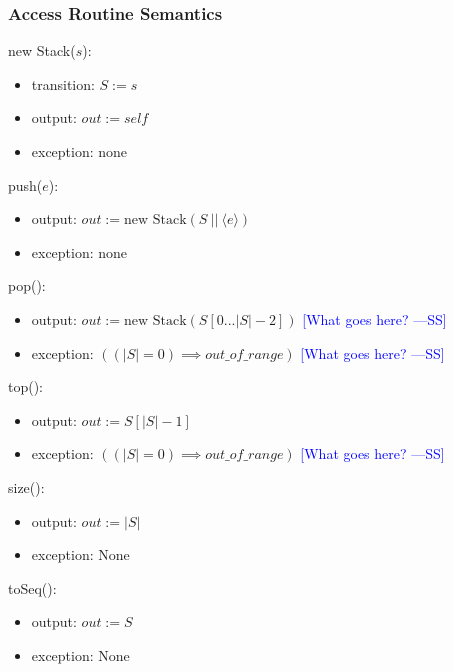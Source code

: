 \documentclass[12pt]{article}
\newcommand{\authornote}[3]{\textcolor{#1}{[#3 ---#2]}}
\newcommand{\authornote}[3]{}
\newcommand{\wss}[1]{\authornote{blue}{SS}{#1}}
\begin{document}
\subsubsection* {Access Routine Semantics}

new Stack($s$):
\begin{itemize}
\item transition: $S := s$

\item output: $\mathit{out} := \mathit{self}$
\item exception: none
\end{itemize}

\noindent push($e$):
\begin{itemize}
\item output: $out := \text{new Stack}(S\ ||\ \langle e \rangle)$
\item exception: none
\end{itemize}

\noindent pop():
\begin{itemize}
\item output: $\mathit{out} := \text{new Stack}(S[0...|S|-2])$  \wss{What goes here?}

\item exception: $((|S| = 0) \implies out\_of\_range)$  \wss{What goes here?}

\end{itemize}

\noindent top():
\begin{itemize}
\item output: $\mathit{out} := S[|S| - 1]$

\item exception: $((|S| = 0) \implies out\_of\_range)$  \wss{What goes here?}

\end{itemize}

\noindent size():
\begin{itemize}
\item output: $\mathit{out} := |S|$
\item exception: None
\end{itemize}

\noindent toSeq():
\begin{itemize}
\item output: $\mathit{out} := S$
\item exception: None

\end{itemize}
\end{document}
